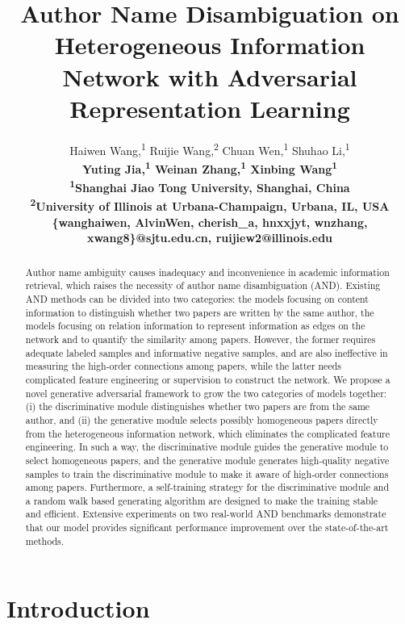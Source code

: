 \documentclass[letterpaper]{article} %
\title{Author Name Disambiguation on Heterogeneous Information Network with Adversarial Representation Learning}
\author{
Haiwen Wang,\textsuperscript{\rm 1}
Ruijie Wang,\textsuperscript{\rm 2}
Chuan Wen,\textsuperscript{\rm 1}
Shuhao Li,\textsuperscript{\rm 1} \\
\bf \Large
Yuting Jia,\textsuperscript{\rm 1}
Weinan Zhang,\textsuperscript{\rm 1}
Xinbing Wang\textsuperscript{\rm 1}  \\
\textsuperscript{\rm 1}Shanghai Jiao Tong University, Shanghai, China\\
\textsuperscript{\rm 2}University of Illinois at Urbana-Champaign, Urbana, IL, USA\\
\{wanghaiwen, AlvinWen, cherish\_a, hnxxjyt, wnzhang, xwang8\}@sjtu.edu.cn,
ruijiew2@illinois.edu}
\begin{document}
\maketitle

\begin{abstract}

Author name ambiguity causes inadequacy and inconvenience in academic information retrieval, which raises the necessity of author name disambiguation (AND).
Existing AND methods can be divided into two categories: the models focusing on content information to distinguish whether two papers are written by the same author, the models focusing on relation information to represent information as edges on the network and to quantify the similarity among papers.
However, the former requires adequate labeled samples and informative negative samples, and are also ineffective in measuring the high-order connections among papers,
while the latter needs complicated feature engineering or supervision to construct the network.
We propose a novel generative adversarial framework to grow the two categories of models together:
(i) the discriminative module distinguishes whether two papers are from the same author, and (ii)
the generative module selects possibly homogeneous papers directly from the heterogeneous information network, which eliminates the complicated feature engineering.
In such a way, the discriminative module guides the generative module to select homogeneous papers, and the generative module generates high-quality negative samples to train the discriminative module to make it aware of high-order connections among papers.
Furthermore,
a self-training strategy for the discriminative module and a random walk based generating algorithm are designed to make the training stable and efficient.
Extensive experiments on two real-world AND benchmarks demonstrate that our model provides significant performance improvement over the state-of-the-art  methods.

\end{abstract}

\section{Introduction}
\end{document}
